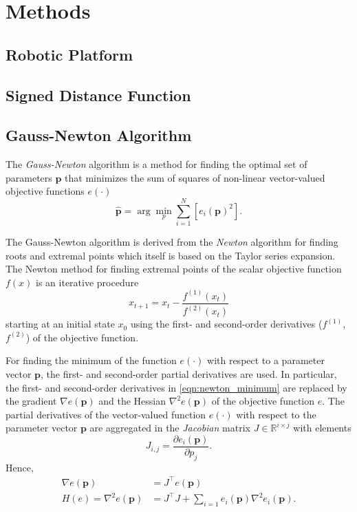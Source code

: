 \chapter{Methods}

\section{Robotic Platform}


\section{Signed Distance Function}


\section{Gauss-Newton Algorithm}

The \textit{Gauss-Newton} algorithm is a method for finding the optimal set of parameters $\mathbf{p}$ that minimizes the sum of squares of non-linear vector-valued objective functions $e(\cdot)$
%
\begin{equation}
\hat{\mathbf{p}} = \arg\min_{p} \sum_{i=1}^N\left[ e_i(\mathbf{p})^2\right] .
\end{equation}

The Gauss-Newton algorithm is derived from the \textit{Newton} algorithm for finding roots and extremal points which itself is based on the Taylor series expansion. The Newton method for finding extremal points of the scalar objective function $f(x)$ is an iterative procedure
%
\begin{equation}
x_{t+1} = x_t - \frac{f^{(1)}(x_t)}{f^{(2)}(x_t)}
\label{eqn:newton_minimum}
\end{equation}
%
starting at an initial state $x_0$ using the first- and second-order derivatives ($f^{(1)}$, $f^{(2)}$) of the objective function.

For finding the minimum of the function $e(\cdot)$ with respect to a parameter vector $\mathbf{p}$, the first- and second-order partial derivatives are used. In particular, the first- and second-order derivatives in \ref{eqn:newton_minimum} are replaced by the gradient $\nabla e(\mathbf{p})$ and the Hessian $\nabla^2 e(\mathbf{p})$ of the objective function $e$.
The partial derivatives of the vector-valued function $e(\cdot)$ with respect to the parameter vector $\mathbf{p}$ are aggregated in the \textit{Jacobian} matrix $J\in \mathbb{R}^{i \times j}$ with elements
%
\begin{equation}
J_{i,j} = \frac{\partial e_i(\mathbf{p})}{\partial p_j} .
\end{equation}
%
Hence,
\begin{align}
\nabla e(\mathbf{p}) &= J^\top e(\mathbf{p}) \label{eqn:gn_gradient}\\
H(e) = \nabla^2 e(\mathbf{p}) &= J^\top J +  \sum_{i=1} e_i(\mathbf{p}) \nabla^2 e_i(\mathbf{p}) \label{eqn:gn_hessian_full}.
\end{align}

